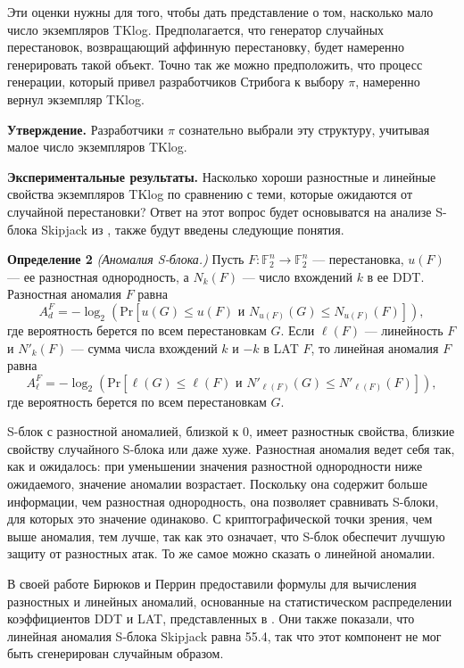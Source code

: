 Эти оценки нужны для того, чтобы дать представление о том, насколько мало число экземпляров TKlog. Предполагается, что генератор случайных перестановок, возвращающий аффинную перестановку, будет намеренно генерировать такой объект. Точно так же можно предположить, что процесс генерации, который привел разработчиков Стрибога к выбору \(\pi\), намеренно вернул экземпляр TKlog.

\textbf{Утверждение.} Разработчики \(\pi\) сознательно выбрали эту структуру, учитывая малое число экземпляров TKlog.

\textbf{Экспериментальные результаты.} Насколько хороши разностные и линейные свойства экземпляров TKlog по сравнению с теми, которые ожидаются от случайной перестановки? Ответ на этот вопрос будет основыватся на анализе S-блока Skipjack из \cite{BP15}, также будут введены следующие понятия.

\textbf{Определение 2} \textit{(Аномалия S-блока.)} Пусть \(F : \mathbb{F}_2^n \to \mathbb{F}_2^n\) — перестановка, \(u(F)\) — ее разностная однородность, а \(N_k(F)\) — число вхождений \(k\) в ее DDT. Разностная аномалия \(F\) равна
\[
A_d^F = -\log_2(\mathrm{Pr}[u(G) \leq u(F) \text{ и } N_{u(F)}(G) \leq N_{u(F)}(F)]),
\]
где вероятность берется по всем перестановкам \(G\). Если \(\ell(F)\) — линейность \(F\) и \(N'_k(F)\) — сумма числа вхождений \(k\) и \(-k\) в LAT \(F\), то линейная аномалия \(F\) равна
\[
A_\ell^F = -\log_2(\mathrm{Pr}[\ell(G) \leq \ell(F) \text{ и } N'_{\ell(F)}(G) \leq N'_{\ell(F)}(F)]),
\]
где вероятность берется по всем перестановкам \(G\).

S-блок с разностной аномалией, близкой к 0, имеет разностнык свойства, близкие свойству случайного S-блока или даже хуже. Разностная аномалия ведет себя так, как и ожидалось: при уменьшении значения разностной однородности ниже ожидаемого, значение аномалии возрастает. Поскольку она содержит больше информации, чем разностная однородность, она позволяет сравнивать S-блоки, для которых это значение одинаково. С криптографической точки зрения, чем выше аномалия, тем лучше, так как это означает, что S-блок обеспечит лучшую защиту от разностных атак. То же самое можно сказать о линейной аномалии.

В своей работе \cite{BP15} Бирюков и Перрин предоставили формулы для вычисления разностных и линейных аномалий, основанные на статистическом распределении коэффициентов DDT и LAT, представленных в \cite{DR07}. Они также показали, что линейная аномалия S-блока Skipjack равна 55.4, так что этот компонент не мог быть сгенерирован случайным образом.

